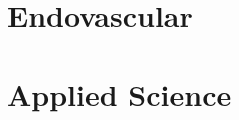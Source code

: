 \documentclass[
]{book}
\begin{document}
\hypertarget{endovascular}{%
\chapter{Endovascular}\label{endovascular}}

\hypertarget{section-12}{%
\section{}\label{section-12}}

\hypertarget{applied-science}{%
\chapter{Applied Science}\label{applied-science}}

\hypertarget{section-13}{%
\section{}\label{section-13}}

  
\end{document}
